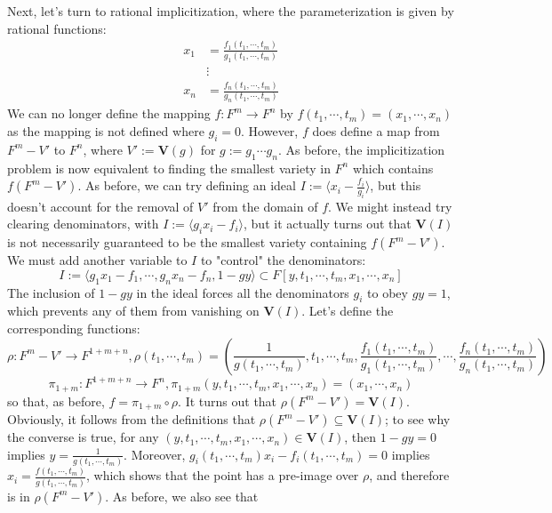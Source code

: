 \documentclass{article}
\begin{document}
\newline
Next, let's turn to rational implicitization, where the parameterization is given by rational functions:
$$ \begin{aligned}
	x_1 &= \frac{f_1(t_1, \cdots, t_m)}{g_1(t_1, \cdots, t_m)} \\
	& \vdots \\
	x_n &= \frac{f_n(t_1, \cdots, t_m)}{g_n(t_1, \cdots, t_m)}
\end{aligned} $$
We can no longer define the mapping $ f: F^m \rightarrow F^n $ by $ f(t_1, \cdots, t_m) = (x_1, \cdots, x_n) $ as the mapping is not defined where $ g_i = 0 $. However, $ f $ does define a map from $ F^m - V' $ to $ F^n $, where $ V' := \mathbf{V}(g) $ for $ g := g_1 \cdots g_n$. As before, the implicitization problem is now equivalent to finding the smallest variety in $ F^n $ which contains $ f(F^m - V') $. As before, we can try defining an ideal $ I := \langle x_i - \frac{f_i}{g_i} \rangle $, but this doesn't account for the removal of $ V' $ from the domain of $ f $. We might instead try clearing denominators, with $ I := \langle g_i x_i - f_i \rangle $, but it actually turns out that $ \mathbf{V}(I) $ is not necessarily guaranteed to be the smallest variety containing $ f(F^m - V') $. We must add another variable to $ I $ to "control" the denominators:
$$ I := \langle g_1 x_1 - f_1, \cdots, g_n x_n - f_n, 1 - g y \rangle \subset F[y, t_1, \cdots, t_m, x_1, \cdots, x_n] $$
The inclusion of $ 1 - g y $ in the ideal forces all the denominators $ g_i $ to obey $ g y = 1 $, which prevents any of them from vanishing on $ \mathbf{V}(I) $. Let's define the corresponding functions:
$$ \rho: F^m - V' \rightarrow F^{1 + m + n}, \rho(t_1, \cdots, t_m) = \left( \frac{1}{g(t_1, \cdots, t_m)}, t_1, \cdots, t_m, \frac{f_1(t_1, \cdots, t_m)}{g_1(t_1, \cdots, t_m)}, \cdots, \frac{f_n(t_1, \cdots, t_m)}{g_n(t_1, \cdots, t_m)} \right) $$
$$ \pi_{1 + m}: F^{1 + m + n} \rightarrow F^n, \pi_{1 + m}(y, t_1, \cdots, t_m, x_1, \cdots, x_n) = (x_1, \cdots, x_n) $$
so that, as before, $ f = \pi_{1 + m} \circ \rho $. It turns out that $ \rho(F^m - V') = \mathbf{V}(I) $. Obviously, it follows from the definitions that $ \rho(F^m - V') \subseteq \mathbf{V}(I) $; to see why the converse is true, for any $ (y, t_1, \cdots, t_m, x_1, \cdots, x_n) \in \mathbf{V}(I) $, then $ 1 - g y = 0 $ implies $ y = \frac{1}{g(t_1, \cdots, t_m)} $. Moreover, $ g_i(t_1, \cdots, t_m) x_i - f_i(t_1, \cdots, t_m) = 0 $ implies $ x_i = \frac{f(t_1, \cdots, t_m)}{g(t_1, \cdots, t_m)} $, which shows that the point has a pre-image over $ \rho $, and therefore is in $ \rho(F^m - V') $. As before, we also see that
\end{document}
